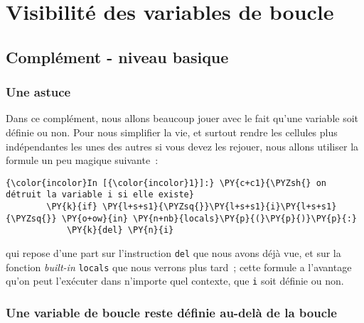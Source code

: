     
    
    
    

    

    \hypertarget{visibilituxe9-des-variables-de-boucle}{%
\section{Visibilité des variables de
boucle}\label{visibilituxe9-des-variables-de-boucle}}

    \hypertarget{compluxe9ment---niveau-basique}{%
\subsection{Complément - niveau
basique}\label{compluxe9ment---niveau-basique}}

    \hypertarget{une-astuce}{%
\subsubsection{Une astuce}\label{une-astuce}}

    Dans ce complément, nous allons beaucoup jouer avec le fait qu'une
variable soit définie ou non. Pour nous simplifier la vie, et surtout
rendre les cellules plus indépendantes les unes des autres si vous devez
les rejouer, nous allons utiliser la formule un peu magique suivante~:

    \begin{Verbatim}[commandchars=\\\{\}]
{\color{incolor}In [{\color{incolor}1}]:} \PY{c+c1}{\PYZsh{} on détruit la variable i si elle existe}
        \PY{k}{if} \PY{l+s+s1}{\PYZsq{}}\PY{l+s+s1}{i}\PY{l+s+s1}{\PYZsq{}} \PY{o+ow}{in} \PY{n+nb}{locals}\PY{p}{(}\PY{p}{)}\PY{p}{:} 
            \PY{k}{del} \PY{n}{i}      
\end{Verbatim}


    qui repose d'une part sur l'instruction \texttt{del} que nous avons déjà
vue, et sur la fonction \emph{built-in} \texttt{locals} que nous verrons
plus tard~; cette formule a l'avantage qu'on peut l'exécuter dans
n'importe quel contexte, que \texttt{i} soit définie ou non.

    \hypertarget{une-variable-de-boucle-reste-duxe9finie-au-deluxe0-de-la-boucle}{%
\subsubsection{Une variable de boucle reste définie au-delà de la
boucle}\label{une-variable-de-boucle-reste-duxe9finie-au-deluxe0-de-la-boucle}}

